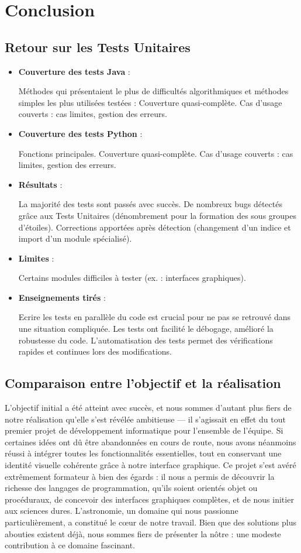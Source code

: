\section{Conclusion}

\subsection{Retour sur les Tests Unitaires}
\begin{itemize}
\item \textbf{Couverture des tests Java} :

Méthodes qui présentaient le plus de difficultés algorithmiques et méthodes simples les plus utilisées testées :
Couverture quasi-complète.
Cas d’usage couverts : cas limites, gestion des erreurs.
\item \textbf{Couverture des tests Python} :

Fonctions principales.
Couverture quasi-complète.
Cas d’usage couverts : cas limites, gestion des erreurs.
\item \textbf{Résultats} :

La majorité des tests sont passés avec succès.
De nombreux bugs détectés grâce aux Tests Unitaires (dénombrement pour la formation des sous groupes d'étoiles).
Corrections apportées après détection (changement d'un indice et import d'un module spécialisé).
\item \textbf{Limites} :

Certains modules difficiles à tester (ex. : interfaces graphiques).
\item \textbf{Enseignements tirés} :

Ecrire les tests en parallèle du code est crucial pour ne pas se retrouvé dans une situation compliquée.
Les tests ont facilité le débogage, amélioré la robustesse du code.
L’automatisation des tests permet des vérifications rapides et continues lors des modifications.
\end{itemize}

\subsection{Comparaison entre l’objectif et la réalisation}

L'objectif initial a été atteint avec succès, et nous sommes d'autant plus fiers de notre réalisation qu'elle s’est révélée ambitieuse — il s’agissait en effet du tout premier projet de développement informatique pour l’ensemble de l’équipe. Si certaines idées ont dû être abandonnées en cours de route, nous avons néanmoins réussi à intégrer toutes les fonctionnalités essentielles, tout en conservant une identité visuelle cohérente grâce à notre interface graphique. Ce projet s’est avéré extrêmement formateur à bien des égards : il nous a permis de découvrir la richesse des langages de programmation, qu’ils soient orientés objet ou procéduraux, de concevoir des interfaces graphiques complètes, et de nous initier aux sciences dures. L’astronomie, un domaine qui nous passionne particulièrement, a constitué le cœur de notre travail. Bien que des solutions plus abouties existent déjà, nous sommes fiers de présenter la nôtre : une modeste contribution à ce domaine fascinant.